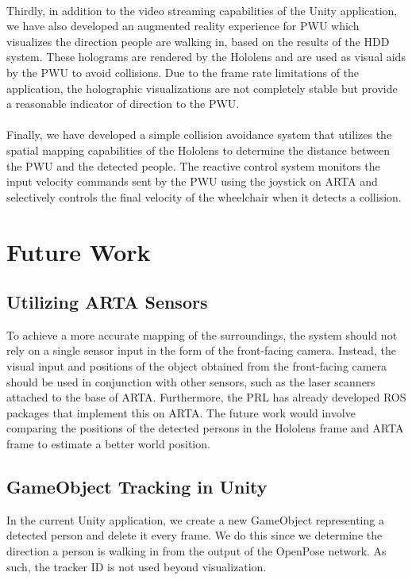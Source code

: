 \paragraph{}Thirdly, in addition to the video streaming capabilities of the Unity application, we have also developed an augmented reality experience for PWU which visualizes the direction people are walking in, based on the results of the HDD system. These holograms are rendered by the Hololens and are used as visual aids by the PWU to avoid collisions. Due to the frame rate limitations of the application, the holographic visualizations are not completely stable but provide a reasonable indicator of direction to the PWU.

\paragraph{}Finally, we have developed a simple collision avoidance system that utilizes the spatial mapping capabilities of the Hololens to determine the distance between the PWU and the detected people. The reactive control system monitors the input velocity commands sent by the PWU using the joystick on ARTA and selectively controls the final velocity of the wheelchair when it detects a collision.

\section{Future Work}

\subsection{Utilizing ARTA Sensors}
To achieve a more accurate mapping of the surroundings, the system should not rely on a single sensor input in the form of the front-facing camera. Instead, the visual input and positions of the object obtained from the front-facing camera should be used in conjunction with other sensors, such as the laser scanners attached to the base of ARTA. Furthermore, the PRL has already developed ROS packages that implement this on ARTA. The future work would involve comparing the positions of the detected persons in the Hololens frame and ARTA frame to estimate a better world position.

\subsection{GameObject Tracking in Unity}
In the current Unity application, we create a new GameObject representing a detected person and delete it every frame. We do this since we determine the direction a person is walking in from the output of the OpenPose network. As such, the tracker ID is not used beyond visualization.

